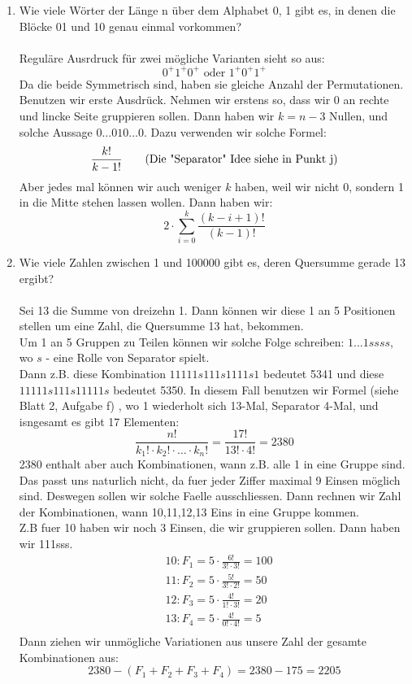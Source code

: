 \begin{enumerate}[label=(\alph*)]
        \item Wie viele Wörter der Länge n über dem Alphabet {0, 1} gibt es, in 
        denen die Blöcke 01 und 10 genau einmal vorkommen?\\\\
        Regul\"are Ausrdruck f\"ur zwei m\"ogliche Varianten sieht so aus:\\
        \[ 0^+1^+0^+\textrm{ oder } 1^+0^+1^+ \]
        Da die beide Symmetrisch sind, haben sie gleiche Anzahl der Permutationen.
        Benutzen wir erste Ausdr\"uck. Nehmen wir erstens so, dass wir 0 an rechte 
        und lincke Seite gruppieren sollen. Dann haben wir $k=n-3$ Nullen, und 
        solche Aussage $0\ldots010\ldots0$. Dazu verwenden wir solche Formel:
        \[\frac{k!}{k-1!} \textrm{\qquad(Die "Separator" Idee siehe in Punkt j)}\]
        Aber jedes mal k\"onnen wir auch weniger $k$ haben, weil wir nicht 0,
        sondern 1 in die Mitte stehen lassen wollen. Dann haben wir: 
        \[2\cdot\sum_{i=0}^k \frac{(k-i+1)!}{(k-1)!}\] 

        \item Wie viele Zahlen zwischen 1 und 100000 gibt es, deren Quersumme gerade 13 ergibt?\\\\
        Sei 13 die Summe von dreizehn 1. Dann k\"onnen wir diese 1 an 5 Positionen 
        stellen um eine Zahl, die Quersumme 13 hat, bekommen.\\
        Um 1 an 5 Gruppen zu Teilen k\"onnen wir solche Folge schreiben:
        $1...1 s s s s$, wo $s$ - eine Rolle von Separator spielt.\\ Dann z.B. diese
        Kombination $11111s111s1111s1$ bedeutet 5341 und diese $11111s111s11111s$
        bedeutet 5350. In diesem Fall benutzen wir Formel (siehe Blatt 2, Aufgabe f)
        , wo 1 wiederholt sich 13-Mal, Separator 4-Mal, und isngesamt es gibt 17 Elementen:
        \[\frac{n!}{k_1!\cdot k_2!\cdot\ldots\cdot k_n!} = \frac{17!}{13!\cdot4!} = 2380\]
        2380 enthalt aber auch Kombinationen, wann z.B. alle 1 in eine Gruppe sind. 
        Das passt uns naturlich nicht, da fuer jeder Ziffer maximal 9 Einsen m\"oglich sind.
        Deswegen sollen wir solche Faelle ausschliessen. Dann rechnen wir Zahl der 
        Kombinationen, wann 10,11,12,13 Eins in eine Gruppe kommen. \\
        Z.B fuer 10 haben wir noch 3 Einsen, die wir gruppieren sollen. Dann haben wir 111sss.
        \begin{align*}
        	&10: F_1 = 5 \cdot \frac{6!}{3!\cdot3!} = 100\\
        	&11: F_2 = 5 \cdot \frac{5!}{3!\cdot2!} = 50\\
        	&12: F_3 = 5 \cdot \frac{4!}{1!\cdot3!} = 20\\
        	&13: F_4 = 5 \cdot \frac{4!}{0!\cdot4!} = 5\\
        \end{align*}
        Dann ziehen wir unm\"ogliche Variationen aus unsere Zahl der gesamte Kombinationen aus:
        \[2380 - (F_1+F_2+F_3+F_4) = 2380 - 175 = 2205\]
    \end{enumerate}
